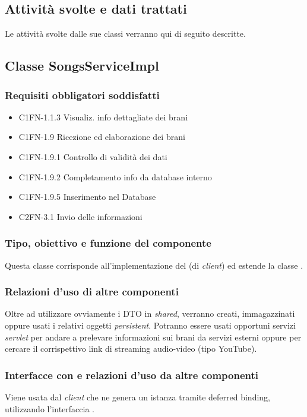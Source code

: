 \subsection*{Attivit\`a svolte e dati trattati}
Le attivit\`a svolte dalle sue classi verranno qui di seguito descritte.

\subsection{Classe SongsServiceImpl}
\subsubsection*{Requisiti obbligatori soddisfatti}
\begin{itemize}
	\item C1FN-1.1.3 Visualiz. info dettagliate dei brani
	\item C1FN-1.9 Ricezione ed elaborazione dei brani
	\item C1FN-1.9.1 Controllo di validit\`a dei dati
	\item C1FN-1.9.2 Completamento info da database interno
	\item C1FN-1.9.5 Inserimento nel Database
	\item C2FN-3.1 Invio delle informazioni
\end{itemize}
\subsubsection*{Tipo, obiettivo e funzione del componente}
Questa classe corrisponde all'implementazione del  (di
\emph{client}) ed estende la classe .

\subsubsection*{Relazioni d'uso di altre componenti}
Oltre ad utilizzare ovviamente i DTO in \emph{shared}, verranno creati,
immagazzinati oppure usati i relativi oggetti \emph{persistent}.
Potranno essere usati opportuni servizi \emph{servlet} per andare a prelevare
informazioni sui brani da servizi esterni oppure per cercare il corrispettivo
link di streaming audio-video (tipo YouTube).

\subsubsection*{Interfacce con e relazioni d'uso da altre componenti}
Viene usata dal \emph{client} che ne genera un istanza tramite deferred binding,
utilizzando l'interfaccia .

